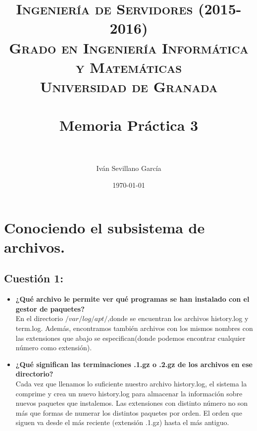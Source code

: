 

\title{	
	\normalfont \normalsize 
	\textsc{{\bf Ingeniería de Servidores (2015-2016)} \\ Grado en Ingeniería Informática y Matemáticas \\ Universidad de Granada} \\ [25pt] %
	\horrule{0.5pt} \\[0.4cm] %
	\huge Memoria Práctica 3 \\ %
	\horrule{2pt} \\[0.5cm] %
}

\author{Iván Sevillano García} %

\date{\normalsize\today} %



\maketitle %

\newpage %

\tableofcontents %

\newpage

\section{Conociendo el subsistema de archivos.}

\subsection{Cuestión 1:}

\begin{itemize}
	\item \textbf{¿Qué archivo le permite ver qué programas se han instalado con el gestor de paquetes?}\\
	En el directorio $/var/log/apt/$,donde se encuentran los archivos history.log y term.log. Además, encontramos también archivos con los mismos nombres con las extensiones que abajo se especifican(donde podemos encontrar cualquier número como extensión).
	
	\item \textbf{¿Qué significan las terminaciones .1.gz o .2.gz de los archivos en ese directorio?}\\
	Cada vez que llenamos lo suficiente nuestro archivo history.log, el sistema la comprime y crea un nuevo history.log para almacenar la información sobre nuevos paquetes que instalemos. Las extensiones con distinto número no son más que formas de numerar los distintos paquetes por orden. El orden que siguen va desde el más reciente (extensión .1.gz) hasta el más antiguo.
	
\end{itemize}

